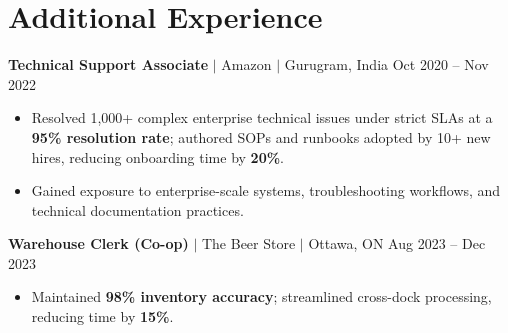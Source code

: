 \documentclass[11pt,a4paper]{article}
\begin{document}
\section{Additional Experience}

\textbf{Technical Support Associate} $|$ Amazon $|$ Gurugram, India \hfill Oct 2020 -- Nov 2022
\begin{itemize}
    \item Resolved 1,000+ complex enterprise technical issues under strict SLAs at a \textbf{95\% resolution rate}; authored SOPs and runbooks adopted by 10+ new hires, reducing onboarding time by \textbf{20\%}.
    \item Gained exposure to enterprise-scale systems, troubleshooting workflows, and technical documentation practices.
\end{itemize}

\vspace{4pt}

\textbf{Warehouse Clerk (Co-op)} $|$ The Beer Store $|$ Ottawa, ON \hfill Aug 2023 -- Dec 2023
\begin{itemize}
    \item Maintained \textbf{98\% inventory accuracy}; streamlined cross-dock processing, reducing time by \textbf{15\%}.
\end{itemize}
\end{document}
